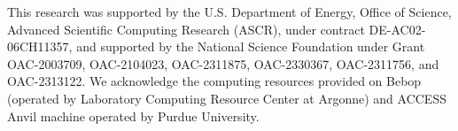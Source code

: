 \documentclass[sigconf, nonacm]{acmart}
\begin{document}


\maketitle

\vldbtopmatter











\begin{acks}
This research was supported by the U.S. Department of Energy, Office of Science, Advanced Scientific Computing Research (ASCR), under contract DE-AC02-06CH11357, and supported by the National Science Foundation under Grant OAC-2003709, OAC-2104023, OAC-2311875, OAC-2330367, OAC-2311756, and OAC-2313122. We acknowledge the computing resources provided on Bebop (operated by Laboratory Computing Resource Center at Argonne) and ACCESS Anvil machine operated by Purdue University.
\end{acks}




\end{document}
